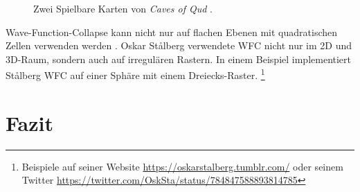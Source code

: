 \documentclass[12pt, a4paper,twoside,openany]{report} %
\begin{document}
\begin{figure}[H]
    \centering
    \caption{Zwei Spielbare Karten von \textit{Caves of Qud} \cite{Karth2017WaveFunctionCollapseIC}.}%
\end{figure}

Wave-Function-Collapse kann nicht nur auf flachen Ebenen mit quadratischen Zellen verwenden werden \cite{boris}.
Oskar Stålberg verwendete WFC nicht nur im 2D und 3D-Raum, sondern auch auf irregulären Rastern.
In einem Beispiel implementiert Stålberg WFC auf einer Sphäre mit einem Dreiecks-Raster.
\footnote[7]{Beispiele auf seiner Website
\url{https://oskarstalberg.tumblr.com/}
oder seinem Twitter
\url{https://twitter.com/OskSta/status/784847588893814785}}

\chapter{Fazit}
\end{document}
